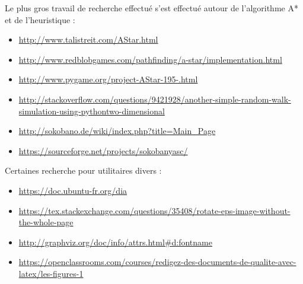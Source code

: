 \documentclass{article}
\begin{document}
\vspace{2 cm}
Le plus gros travail de recherche effectué s'est effectué autour de l'algorithme A* et de l'heuristique :
\begin{itemize}
 \item \url{http://www.talistreit.com/AStar.html}
 \item \url{http://www.redblobgames.com/pathfinding/a-star/implementation.html}
 \item \url{http://www.pygame.org/project-AStar-195-.html}
 \item \url{http://stackoverflow.com/questions/9421928/another-simple-random-walk-simulation-using-pythontwo-dimensional}
 \item \url{http://sokobano.de/wiki/index.php?title=Main_Page}
 \item \url{https://sourceforge.net/projects/sokobanyasc/}
\end{itemize}
Certaines recherche pour utilitaires divers :
\begin{itemize}
 \item \url{https://doc.ubuntu-fr.org/dia}
 \item \url{https://tex.stackexchange.com/questions/35408/rotate-eps-image-without-the-whole-page}
 \item \url{http://graphviz.org/doc/info/attrs.html#d:fontname}
 \item \url{https://openclassrooms.com/courses/redigez-des-documents-de-qualite-avec-latex/les-figures-1}
\end{itemize}
\end{document}
